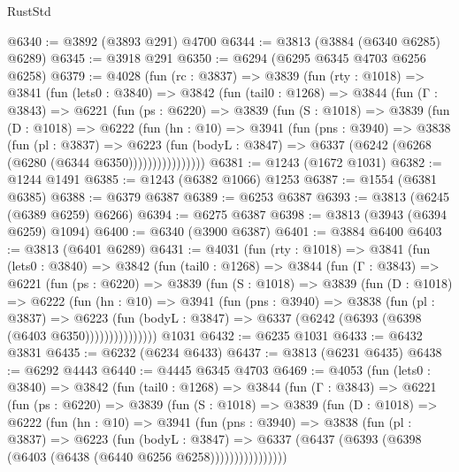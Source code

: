 \begin{lexlean}{RustStd}
\begin{coremodule}
{\begin{coremodule}
{{{{{{{{{{{{{{{{{{{{{{{{{{{{{{{{{{{@6340 := @3892 (@3893 @291) @4700
@6344 := @3813 (@3884 (@6340 @6285) @6289)
@6345 := @3918 @291
@6350 := @6294 (@6295 @6345 @4703 @6256 @6258)
@6379 := @4028
    (fun (rc : @3837) =>
    @3839
      (fun (rty : @1018) =>
      @3841
        (fun (lets0 : @3840) =>
        @3842
          (fun (tail0 : @1268) =>
          @3844
            (fun (Γ : @3843) =>
            @6221
              (fun (ps : @6220) =>
              @3839
                (fun (S : @1018) =>
                @3839
                  (fun (D : @1018) =>
                  @6222
                    (fun (hn : @10) =>
                    @3941
                      (fun (pns : @3940) =>
                      @3838
                        (fun (pl : @3837) =>
                        @6223
                          (fun (bodyL : @3847) =>
                          @6337 (@6242 (@6268 (@6280 (@6344 @6350))))))))))))))))
@6381 := @1243 (@1672 @1031)
@6382 := @1244 @1491
@6385 := @1243 (@6382 @1066) @1253
@6387 := @1554 (@6381 @6385)
@6388 := @6379 @6387
@6389 := @6253 @6387
@6393 := @3813 (@6245 (@6389 @6259) @6266)
@6394 := @6275 @6387
@6398 := @3813 (@3943 (@6394 @6259) @1094)
@6400 := @6340 (@3900 @6387)
@6401 := @3884 @6400
@6403 := @3813 (@6401 @6289)
@6431 := @4031
    (fun (rty : @1018) =>
    @3841
      (fun (lets0 : @3840) =>
      @3842
        (fun (tail0 : @1268) =>
        @3844
          (fun (Γ : @3843) =>
          @6221
            (fun (ps : @6220) =>
            @3839
              (fun (S : @1018) =>
              @3839
                (fun (D : @1018) =>
                @6222
                  (fun (hn : @10) =>
                  @3941
                    (fun (pns : @3940) =>
                    @3838
                      (fun (pl : @3837) =>
                      @6223
                        (fun (bodyL : @3847) =>
                        @6337 (@6242 (@6393 (@6398 (@6403 @6350)))))))))))))))
    @1031
@6432 := @6235 @1031
@6433 := @6432 @3831
@6435 := @6232 (@6234 @6433)
@6437 := @3813 (@6231 @6435)
@6438 := @6292 @4443
@6440 := @4445 @6345 @4703
@6469 := @4053
    (fun (lets0 : @3840) =>
    @3842
      (fun (tail0 : @1268) =>
      @3844
        (fun (Γ : @3843) =>
        @6221
          (fun (ps : @6220) =>
          @3839
            (fun (S : @1018) =>
            @3839
              (fun (D : @1018) =>
              @6222
                (fun (hn : @10) =>
                @3941
                  (fun (pns : @3940) =>
                  @3838
                    (fun (pl : @3837) =>
                    @6223
                      (fun (bodyL : @3847) =>
                      @6337 (@6437 (@6393 (@6398 (@6403 (@6438 (@6440 @6256 @6258))))))))))))))))
}}}}}}}}}}}}}}}}}}}}}}}}}}}}}}}}}}}
\end{coremodule}}
\end{coremodule}
\end{lexlean}
